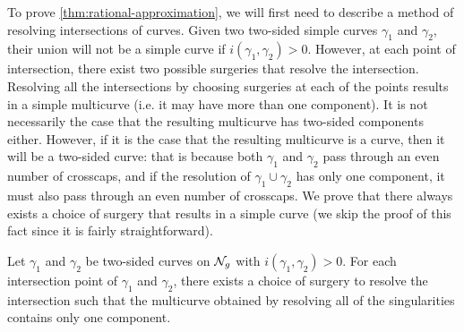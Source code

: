 \documentclass[12pt, reqno]{amsart}
\begin{document}
To prove \autoref{thm:rational-approximation}, we will first need to describe a method of resolving intersections of curves.
Given two two-sided simple curves $\gamma_1$ and $\gamma_2$, their union will not be a simple curve if $i(\gamma_1, \gamma_2) > 0$.
However, at each point of intersection, there exist two possible surgeries that resolve the intersection.
Resolving all the intersections by choosing surgeries at each of the points results in a simple multicurve (i.e. it may have more than one component).
It is not necessarily the case that the resulting multicurve has two-sided components either.
However, if it is the case that the resulting multicurve is a curve, then it will be a two-sided curve: that is because both $\gamma_1$ and $\gamma_2$ pass through an even number of crosscaps, and if the resolution of $\gamma_1 \cup \gamma_2$ has only one component, it must also pass through an even number of crosscaps.
We prove that there always exists a choice of surgery that results in a simple curve (we skip the proof of this fact since it is fairly straightforward).
\begin{lemma}
  \label{lem:valid-surgery}
  Let $\gamma_1$ and $\gamma_2$ be two-sided curves on $\mathcal{N}_g$ with $i(\gamma_1, \gamma_2) > 0$.
  For each intersection point of $\gamma_1$ and $\gamma_2$, there exists a choice of surgery to resolve the intersection such that the multicurve obtained by resolving all of the singularities contains only one component.
\end{lemma}
\end{document}
